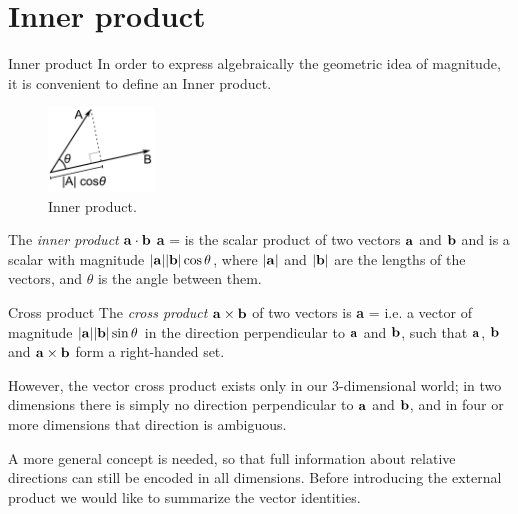 \documentclass[10pt]{beamer}
\begin{document}
\section{Inner product}
\begin{frame}[shrink=10]{Inner product}
In order to express algebraically the geometric idea of magnitude, it is convenient to define an \alert{Inner product}.

%
\begin{figure}[tb]
\centering
\includegraphics[width=0.25\textwidth]{Dot_Product.png}
\caption{Inner product.}
\label{Dot_Product} 
\end{figure}

The \emph{inner product} ${\bf a} \cdot {\bf b}$
\be
{\bf a}  =   \cos \theta
\label{innerp}
\ee
 is the scalar product of two vectors $\bf a$ and $\bf b$ and is a scalar with magnitude $\abs{\bf a} \abs{\bf b} \cos \theta$, where $\abs{\bf a}$ and $\abs{\bf b}$ are the
 lengths of the vectors, and $\theta$ is the angle between them. 
\end{frame}
\begin{frame}[fragile]{Cross product}
%
The \emph{cross product} ${\bf a} \times {\bf b}$ of two vectors is
\be
{\bf a}  =   \sin \theta
\label{outerp}
\ee
i.e. a vector of magnitude $\abs{\bf a} \abs{\bf b} \sin \theta$ in the direction perpendicular to $\bf a$ and $\bf b$, such that \alert{$\bf a$, $\bf b$ and ${\bf a} \times {\bf b}$  form a right-handed set}.

However, \alert{the vector cross product exists only in our 3-dimensional world}; in two dimensions there is simply no direction perpendicular to $\bf a$ and $\bf b$, and in four or more dimensions that direction is ambiguous. 

A more general concept is needed, so that full information about relative directions can still be encoded in all dimensions.
Before introducing the external product we would like to summarize the vector identities. 
\end{frame}
\end{document}
